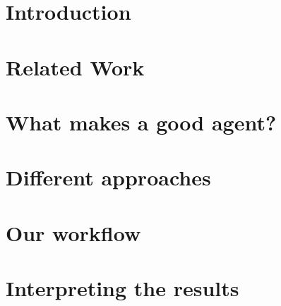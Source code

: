 \documentclass
[
    twoside,                 %
    openright,               %
    cleardoublepage = empty, %
    fontsize = 12 pt,        %
    british,                 %
    captions = tableheading, %
    numbers = noenddot,      %
    footheight = 35 pt,      %
]
{scrbook}
\begin{document}
\frontmatter


\pagestyle{plain}







\tableofcontents

\pagestyle{headings}
\mainmatter


\chapter{Introduction}


\chapter{Related Work}


\chapter{What makes a good agent?}


\chapter{Different approaches}


\chapter{Our workflow}


\chapter{Interpreting the results}


% 
\end{document}
